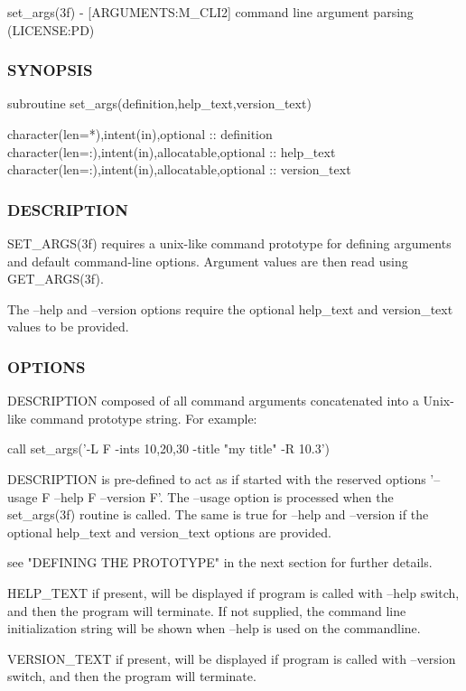 set\+\_\+args(3f) -\/ \mbox{[}A\+R\+G\+U\+M\+E\+N\+TS\+:M\+\_\+\+C\+L\+I2\mbox{]} command line argument parsing (L\+I\+C\+E\+N\+SE\+:PD) 

\subsubsection*{S\+Y\+N\+O\+P\+S\+IS}

\begin{DoxyVerb} subroutine set_args(definition,help_text,version_text)

  character(len=*),intent(in),optional :: definition
  character(len=:),intent(in),allocatable,optional :: help_text
  character(len=:),intent(in),allocatable,optional :: version_text
\end{DoxyVerb}
 \subsubsection*{D\+E\+S\+C\+R\+I\+P\+T\+I\+ON}

\begin{DoxyVerb} SET_ARGS(3f) requires a unix-like command prototype for defining
 arguments and default command-line options. Argument values are then
 read using GET_ARGS(3f).

 The --help and --version options require the optional
 help_text and version_text values to be provided.
\end{DoxyVerb}


\subsubsection*{O\+P\+T\+I\+O\+NS}

\begin{DoxyVerb}  DESCRIPTION   composed of all command arguments concatenated
                into a Unix-like command prototype string. For
                example:

                  call set_args('-L F -ints 10,20,30 -title "my title" -R 10.3')

                DESCRIPTION is pre-defined to act as if started with the reserved
                options '--usage F --help F --version F'. The --usage
                option is processed when the set_args(3f)
                routine is called. The same is true for --help and --version
                if the optional help_text and version_text options are
                provided.

                see "DEFINING THE PROTOTYPE" in the next section for further
                details.

  HELP_TEXT     if present, will be displayed if program is called with
                --help switch, and then the program will terminate. If
                not supplied, the command line initialization string will be
                shown when --help is used on the commandline.

  VERSION_TEXT  if present, will be displayed if program is called with
                --version switch, and then the program will terminate.
\end{DoxyVerb}


